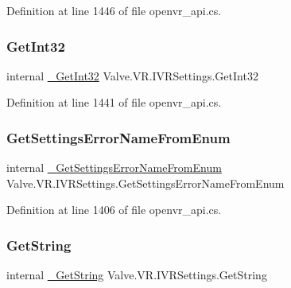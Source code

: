 Definition at line 1446 of file openvr\+\_\+api.\+cs.

\mbox{\label{struct_valve_1_1_v_r_1_1_i_v_r_settings_a6b687766c84c94e74019dc452ca49bd6}} 
\subsubsection{\texorpdfstring{GetInt32}{GetInt32}}
{\footnotesize\ttfamily internal \mbox{\hyperlink{struct_valve_1_1_v_r_1_1_i_v_r_settings_a8477f6872b134bfeb56540d1f1945230}{\+\_\+\+Get\+Int32}} Valve.\+V\+R.\+I\+V\+R\+Settings.\+Get\+Int32}



Definition at line 1441 of file openvr\+\_\+api.\+cs.

\mbox{\label{struct_valve_1_1_v_r_1_1_i_v_r_settings_a5c300dc88e991f046f5ce75f519df668}} 
\subsubsection{\texorpdfstring{GetSettingsErrorNameFromEnum}{GetSettingsErrorNameFromEnum}}
{\footnotesize\ttfamily internal \mbox{\hyperlink{struct_valve_1_1_v_r_1_1_i_v_r_settings_a04ee1d90a6a44d0e51d2a78055ca775c}{\+\_\+\+Get\+Settings\+Error\+Name\+From\+Enum}} Valve.\+V\+R.\+I\+V\+R\+Settings.\+Get\+Settings\+Error\+Name\+From\+Enum}



Definition at line 1406 of file openvr\+\_\+api.\+cs.

\mbox{\label{struct_valve_1_1_v_r_1_1_i_v_r_settings_a2d735b829971971837e75851095c7ccd}} 
\subsubsection{\texorpdfstring{GetString}{GetString}}
{\footnotesize\ttfamily internal \mbox{\hyperlink{struct_valve_1_1_v_r_1_1_i_v_r_settings_a5e71f8b4740ba05ea4fa424674adefbb}{\+\_\+\+Get\+String}} Valve.\+V\+R.\+I\+V\+R\+Settings.\+Get\+String}



